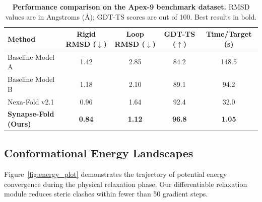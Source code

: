 \documentclass[10pt,a4paper]{scrartcl}
\begin{document}
\begin{table}[H]
  \centering
  \caption{\textbf{Performance comparison on the Apex-9 benchmark dataset.} RMSD values are in Angstroms (\AA); GDT-TS scores are out of 100. Best results in bold.}
  \label{tab:benchmarks}
  \vspace{1.5mm}
  \small
  \begin{tabularx}{\linewidth}{X c c c c}
    \toprule
    \textbf{Method} & \textbf{Rigid RMSD ($\downarrow$)} & \textbf{Loop RMSD ($\downarrow$)} & \textbf{GDT-TS ($\uparrow$)} & \textbf{Time/Target (s)} \\
    \midrule
    Baseline Model A & 1.42 & 2.85 & 84.2 & 148.5 \\
    Baseline Model B & 1.18 & 2.10 & 89.1 & 94.2 \\
    Nexa-Fold v2.1   & 0.96 & 1.64 & 92.4 & 32.0 \\
    \rowcolor{lightbg}
    \textbf{Synapse-Fold (Ours)} & \textbf{0.84} & \textbf{1.12} & \textbf{96.8} & \textbf{1.05} \\
    \bottomrule
  \end{tabularx}
\end{table}

\subsection{Conformational Energy Landscapes}

Figure~\ref{fig:energy_plot} demonstrates the trajectory of potential energy convergence during the physical relaxation phase. Our differentiable relaxation module reduces steric clashes within fewer than 50 gradient steps.
\end{document}
